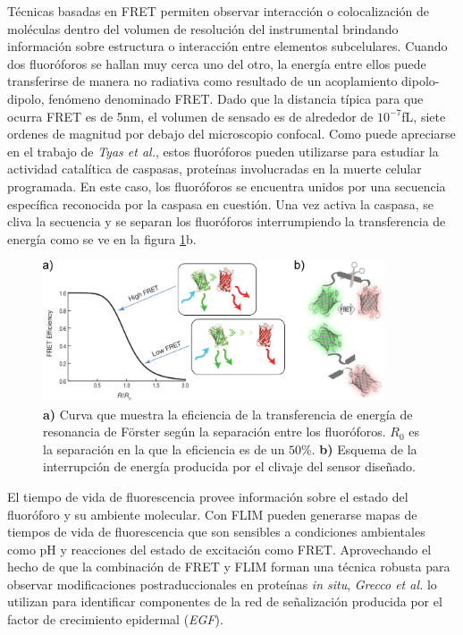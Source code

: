 Técnicas basadas en FRET permiten observar interacción o colocalización de moléculas dentro del volumen de resolución del instrumental brindando información sobre estructura o interacción entre elementos subcelulares. Cuando dos fluoróforos se hallan muy cerca uno del otro, la energía entre ellos puede transferirse de manera no radiativa como resultado de un acoplamiento dipolo-dipolo, fenómeno denominado FRET. Dado que la distancia típica para que ocurra FRET es de 5nm, el volumen de sensado es de alrededor de $10^{-7}$fL, siete ordenes de magnitud por debajo del microscopio confocal\cite{GreccoBastiaens2009}. Como puede apreciarse en el trabajo de \textit{Tyas et al.}\cite{Tyas2000}, estos fluoróforos pueden utilizarse para estudiar la actividad catalítica de caspasas, proteínas involucradas en la muerte celular programada. En este caso, los fluoróforos se encuentra unidos por una secuencia específica reconocida por la caspasa en cuestión. Una vez activa la caspasa, se cliva la secuencia y se separan los fluoróforos interrumpiendo la transferencia de energía como se ve en la figura \ref{fig:FRET}b.


\begin{figure}
    \centering
    \includegraphics[width=0.9\textwidth]{./img/FRETClivaje.png}
    \caption{\textbf{a)} Curva que muestra la eficiencia de la transferencia de energía de resonancia de Förster según la separación entre los fluoróforos. $R_0$ es la separación en la que la eficiencia es de un $50\%$\cite{GreccoBastiaens2009}. \textbf{b)} Esquema de la interrupción de energía producida por el clivaje del sensor diseñado.}
    \label{fig:FRET}
\end{figure}

El tiempo de vida de fluorescencia provee información sobre el estado del fluoróforo y su ambiente molecular. Con FLIM pueden generarse mapas de tiempos de vida de fluorescencia que son sensibles a condiciones ambientales como pH y reacciones del estado de excitación como FRET\cite{Grecco2009}. Aprovechando el hecho de que la combinación de FRET y FLIM forman una técnica robusta para observar modificaciones postraduccionales en proteínas \textit{in situ}, \textit{Grecco et al.}\cite{Grecco2010} lo utilizan para identificar componentes de la red de señalización producida por el factor de crecimiento epidermal (\textit{EGF}).

